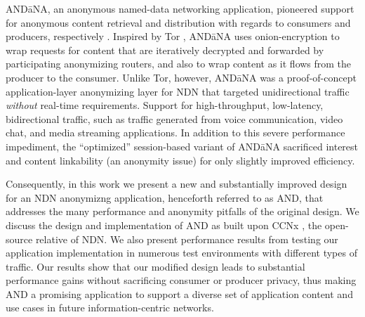 {\sf AND\=aNA}, an anonymous named-data networking application, pioneered support for anonymous content retrieval and distribution with regards to consumers and producers, respectively \cite{andana}. Inspired by Tor \cite{Tor}, {\sf AND\=aNA} uses onion-encryption to wrap requests for content that are iteratively decrypted and forwarded by participating anonymizing routers, and also to wrap content as it flows from the producer to the consumer. Unlike Tor, however, {\sf AND\=aNA} was a proof-of-concept application-layer anonymizing layer for NDN that targeted unidirectional traffic \emph{without} real-time requirements. Support for high-throughput, low-latency, bidirectional traffic, such as traffic generated from voice communication, video chat, and media streaming applications. In addition to this severe performance impediment, the ``optimized'' session-based variant of {\sf AND\=aNA} sacrificed interest and content linkability (an anonymity issue) for only slightly improved efficiency. 

Consequently, in this work we present a new and substantially improved design for an NDN anonymizng application, henceforth referred to as {\sf AND}, that addresses the many performance and anonymity pitfalls of the original design. We discuss the design and implementation of {\sf AND} as built upon CCNx \cite{ccnx}, the open-source relative of NDN. We also present performance results from testing our application implementation in numerous test environments with different types of traffic. Our results show that our modified design leads to  substantial performance gains without sacrificing consumer or producer privacy, thus making {\sf AND} a promising application to support a diverse set of application content and use cases in future information-centric networks.
